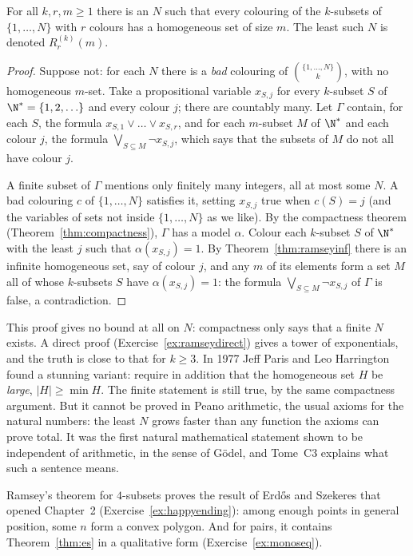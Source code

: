 \begin{theorem}\label{thm:ramseyfin}
For all $k,r,m\ge1$ there is an $N$ such that every colouring of the $k$-subsets of $\{1,\dots,N\}$ with $r$ colours has a homogeneous set of size $m$. The
least such $N$ is denoted $R^{(k)}_r(m)$.
\end{theorem}
\begin{proof}
Suppose not: for each $N$ there is a \emph{bad} colouring of $\binom{\{1,\dots,N\}}k$, with no homogeneous $m$-set. Take a propositional variable $x_{S,j}$ for every $k$-subset $S$
of $\N^*=\{1,2,\ldots\}$ and every colour $j$; there are countably many. Let $\Gamma$ contain, for each $S$, the formula $x_{S,1}\lor\dots\lor x_{S,r}$, and for each $m$-subset $M$ of $\N^*$ and each colour
$j$, the formula $\bigvee_{S\subseteq M}\neg x_{S,j}$, which says that the subsets of $M$ do not all have colour $j$.

A finite subset of $\Gamma$ mentions only finitely many integers, all at most some $N$. A bad colouring $c$ of $\{1,\dots,N\}$ satisfies it, setting $x_{S,j}$ true when
$c(S)=j$ (and the variables of sets not inside $\{1,\dots,N\}$ as we like). By the compactness theorem (Theorem~\ref{thm:compactness}), $\Gamma$ has a model $\alpha$. Colour
each $k$-subset $S$ of $\N^*$ with the least $j$ such that $\alpha(x_{S,j})=1$. By Theorem~\ref{thm:ramseyinf} there is an infinite homogeneous set, say of colour $j$, and any
$m$ of its elements form a set $M$ all of whose $k$-subsets $S$ have $\alpha(x_{S,j})=1$: the formula $\bigvee_{S\subseteq M}\neg x_{S,j}$ of $\Gamma$ is false, a contradiction.
\end{proof}

This proof gives no bound at all on $N$: compactness only says that a finite $N$ exists. A direct proof (Exercise~\ref{ex:ramseydirect}) gives a tower of
exponentials, and the truth is close to that for $k\ge3$. In 1977 Jeff Paris and Leo Harrington found a stunning variant: require in addition that the homogeneous
set $H$ be \emph{large}, $|H|\ge\min H$. The finite statement is still true, by the same compactness argument. But it cannot be proved in Peano arithmetic, the
usual axioms for the natural numbers: the least $N$ grows faster than any function the axioms can prove total. It was the first natural mathematical
statement shown to be independent of arithmetic, in the sense of G\"odel, and Tome~C3 explains what such a sentence means.

Ramsey's theorem for $4$-subsets proves the result of Erd\H os and Szekeres that opened Chapter~2 (Exercise~\ref{ex:happyending}): among enough points in general
position, some $n$ form a convex polygon. And for pairs, it contains Theorem~\ref{thm:es} in a qualitative form (Exercise~\ref{ex:monoseq}).

